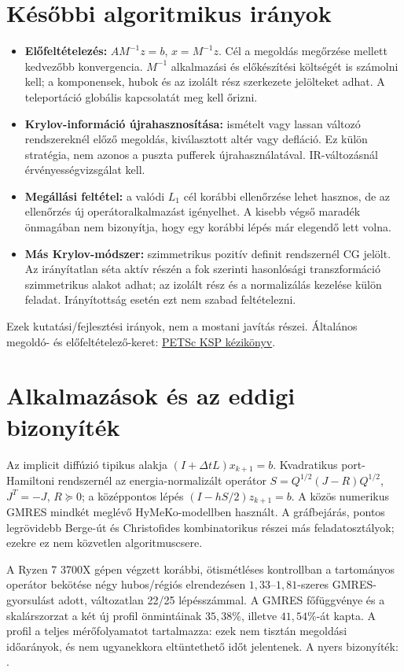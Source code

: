\documentclass[11pt,a4paper]{article}
\begin{document}
\newpage\section{Későbbi algoritmikus irányok}
\begin{itemize}
\item \textbf{Előfeltételezés:} $AM^{-1}z=b$, $x=M^{-1}z$. Cél a megoldás
megőrzése mellett kedvezőbb konvergencia. $M^{-1}$ alkalmazási és előkészítési
költségét is számolni kell; a komponensek, hubok és az izolált rész szerkezete
jelölteket adhat. A teleportáció globális kapcsolatát meg kell őrizni.
\item \textbf{Krylov-információ újrahasznosítása:} ismételt vagy lassan változó
rendszereknél előző megoldás, kiválasztott altér vagy defláció. Ez külön stratégia,
nem azonos a puszta pufferek újrahasználatával. IR-változásnál érvényességvizsgálat kell.
\item \textbf{Megállási feltétel:} a valódi $L_1$ cél korábbi ellenőrzése lehet
hasznos, de az ellenőrzés új operátoralkalmazást igényelhet. A kisebb végső maradék
önmagában nem bizonyítja, hogy egy korábbi lépés már elegendő lett volna.
\item \textbf{Más Krylov-módszer:} szimmetrikus pozitív definit rendszernél CG
jelölt. Az irányítatlan séta aktív részén a fok szerinti hasonlósági transzformáció
szimmetrikus alakot adhat; az izolált rész és a normalizálás kezelése külön feladat.
Irányítottság esetén ezt nem szabad feltételezni.
\end{itemize}
Ezek kutatási/fejlesztési irányok, nem a mostani javítás részei.
Általános megoldó- és előfeltételező-keret:
\href{https://petsc.org/release/manual/ksp/}{PETSc KSP kézikönyv}.

\section{Alkalmazások és az eddigi bizonyíték}
Az implicit diffúzió tipikus alakja $(I+\Delta t L)x_{k+1}=b$.
Kvadratikus port-Hamiltoni rendszernél az energia-normalizált operátor
$S=Q^{1/2}(J-R)Q^{1/2}$, $J^T=-J$, $R\succeq0$; a középpontos lépés
$(I-hS/2)z_{k+1}=b$. A közös numerikus GMRES mindkét meglévő HyMeKo-modellben
használt. A gráfbejárás, pontos legrövidebb Berge-út és Christofides kombinatorikus
részei más feladatosztályok; ezekre ez nem közvetlen algoritmuscsere.

A Ryzen 7 3700X gépen végzett korábbi, ötismétléses kontrollban a tartományos operátor bekötése
négy hubos/régiós elrendezésen $1{,}33$--$1{,}81$-szeres GMRES-gyorsulást adott,
változatlan 22/25 lépésszámmal. A GMRES főfüggvénye és a skalárszorzat a két
új profil önmintáinak $35{,}38\%$, illetve $41{,}54\%$-át kapta. A profil a teljes
mérőfolyamatot tartalmazza: ezek nem tisztán megoldási időarányok, és nem
ugyanekkora eltüntethető időt jelentenek. A nyers bizonyíték:
.
\end{document}
